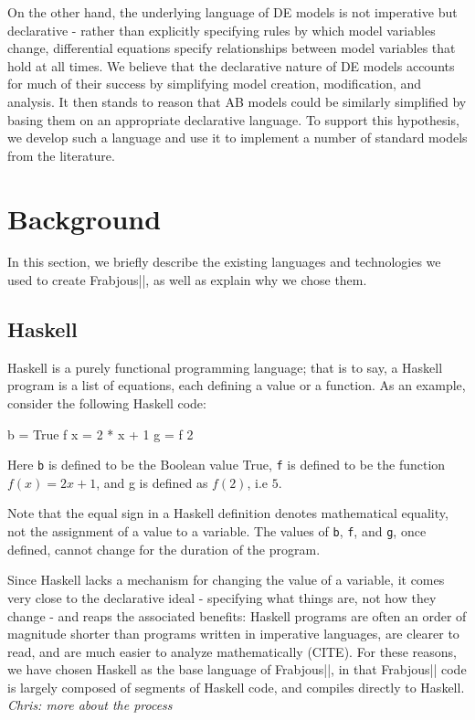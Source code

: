 \documentclass{sig-alternate}
\begin{document}
  On the other hand, the underlying language of DE models is not imperative but declarative - rather than explicitly specifying rules by which model variables change, differential equations specify relationships between model variables that hold at all times. We believe that the declarative nature of DE models accounts for much of their success by simplifying model creation, modification, and analysis. It then stands to reason that AB models could be similarly simplified by basing them on an appropriate declarative language. To support this hypothesis, we develop such a language and use it to implement a number of standard models from the literature. 
  
  

\section{Background}
In this section, we briefly describe the existing languages and technologies we used to create Frabjous||, as well as explain why we chose them.
\subsection{Haskell}

  Haskell is a purely functional programming language; that is to say, a Haskell program is a list of equations, each defining a value or a function.
As an example, consider the following Haskell code:
  \begin{code}
  b = True
  f x = 2 * x + 1
  g = f 2
  \end{code}
  
  Here \lstinline{b} is defined to be the Boolean value True, \lstinline{f} is defined to be the function $f(x) = 2x+1$, and g is defined as $f(2)$, i.e $5$. 
  
  Note that the equal sign in a Haskell definition denotes mathematical equality, not the assignment of a value to a variable. The values of \lstinline{b}, \lstinline{f}, and \lstinline{g}, once defined, cannot change for the duration of the program.

  Since Haskell lacks a mechanism for changing the value of a variable, it comes very close to the declarative ideal - specifying what things are, not how they change - and reaps the associated benefits: Haskell programs are often an order of magnitude shorter than programs written in imperative languages, are clearer to read, and are much easier to analyze mathematically (CITE). For these reasons, we have chosen Haskell as the base language of Frabjous||, in that Frabjous|| code is largely composed of segments of Haskell code, and compiles directly to Haskell. \textit{Chris: more about the process}
  
\end{document}
